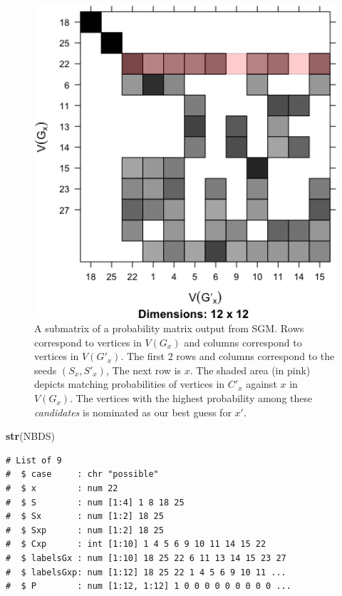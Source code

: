 \documentclass[
]{article}
\newenvironment{Shaded}{\begin{snugshade}}{\end{snugshade}}
\newcommand{\KeywordTok}[1]{\textcolor[rgb]{0.13,0.29,0.53}{\textbf{#1}}}
\newcommand{\NormalTok}[1]{#1}
\begin{document}
\begin{figure}
\centering
\includegraphics{vn_files/figure-latex/sgm-1.png}
\caption{A submatrix of a probability matrix output from SGM. Rows
correspond to vertices in \(V(G_x)\) and columns correspond to vertices
in \(V(G'_x)\). The first 2 rows and columns correspond to the seeds
\((S_x,S'_x)\), The next row is \(x\). The shaded area (in pink) depicts
matching probabilities of vertices in \(C'_x\) against \(x\) in
\(V(G_x)\). The vertices with the highest probability among these
\emph{candidates} is nominated as our best guess for \(x'\).}
\end{figure}

\begin{Shaded}
\begin{Highlighting}[]
\KeywordTok{str}\NormalTok{(NBDS)}
\end{Highlighting}
\end{Shaded}

\begin{verbatim}
# List of 9
#  $ case     : chr "possible"
#  $ x        : num 22
#  $ S        : num [1:4] 1 8 18 25
#  $ Sx       : num [1:2] 18 25
#  $ Sxp      : num [1:2] 18 25
#  $ Cxp      : int [1:10] 1 4 5 6 9 10 11 14 15 22
#  $ labelsGx : num [1:10] 18 25 22 6 11 13 14 15 23 27
#  $ labelsGxp: num [1:12] 18 25 22 1 4 5 6 9 10 11 ...
#  $ P        : num [1:12, 1:12] 1 0 0 0 0 0 0 0 0 0 ...
\end{verbatim}
\end{document}
